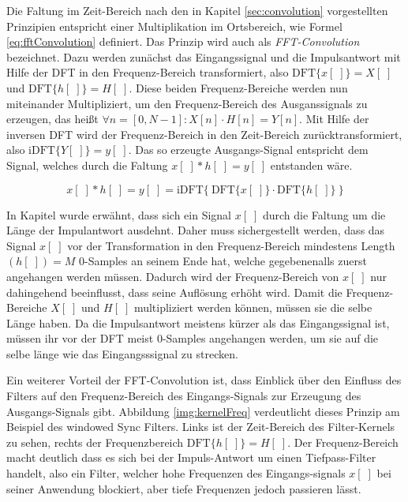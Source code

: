 Die Faltung im Zeit-Bereich nach den in Kapitel \ref{sec:convolution} vorgestellten Prinzipien entspricht einer Multiplikation im Ortsbereich, wie Formel \ref{eq:fftConvolution} definiert. Das Prinzip wird auch als \emph{FFT-Convolution} bezeichnet. Dazu werden zunächst das Eingangssignal und die Impulsantwort mit Hilfe der DFT in den Frequenz-Bereich transformiert, also $\text{DFT}\{x[\;]\} = X[\;]$ und $\text{DFT}\{h[\;]\} = H[\;]$. Diese beiden Frequenz-Bereiche werden nun miteinander Multipliziert, um den Frequenz-Bereich des Ausganssignals zu erzeugen, das heißt $\forall n = [0,N-1]: X[n] \cdot H[n] = Y[n]$. Mit Hilfe der inversen DFT wird der Frequenz-Bereich in den Zeit-Bereich zurücktransformiert, also $\text{iDFT}\{ Y[\;] \} = y[\;]$. Das so erzeugte Ausgangs-Signal entspricht dem Signal, welches durch die Faltung $x[\;] * h[\;] = y[\;]$ entstanden wäre.\cite[S. 182]{dspGuide}

\begin{equation}
x[\;] * h[\;] = y[\;] = \text{iDFT}\Big\{\ \text{DFT}\{x[\;]\} \cdot \text{DFT}\{h[\;]\}\ \Big\}
\label{eq:fftConvolution}
\end{equation}

In Kapitel \label{sec:convolution} wurde erwähnt, dass sich ein Signal $x[\;]$ durch die Faltung um die Länge der Impulantwort ausdehnt. Daher muss sichergestellt werden, dass das Signal $x[\;]$ vor der Transformation in den Frequenz-Bereich mindestens Length$(h[\;]) = M$ 0-Samples an seinem Ende hat, welche gegebenenalls zuerst angehangen werden müssen. Dadurch wird der Frequenz-Bereich von $x[\;]$ nur dahingehend beeinflusst, dass seine Auflösung erhöht wird. Damit die Frequenz-Bereiche $ X[\;]$ und $H[\;]$ multipliziert werden können, müssen sie die selbe Länge haben. Da die Impulsantwort meistens kürzer als das Eingangssignal ist, müssen ihr vor der DFT meist 0-Samples angehangen werden, um sie auf die selbe länge wie das Eingangsssignal \glqq zu strecken\grqq{}.\cite[S. 183 -184]{dspGuide}

Ein weiterer Vorteil der FFT-Convolution ist, dass Einblick über den Einfluss des Filters auf den Frequenz-Bereich des Eingangs-Signals zur Erzeugung des Ausgangs-Signals gibt. Abbildung \ref{img:kernelFreq} verdeutlicht dieses Prinzip am Beispiel des \glqq windowed Sync Filters\grqq.  Links ist der Zeit-Bereich des Filter-Kernels zu sehen, rechts der Frequenzbereich $\text{DFT}\{h[\;]\} = H[\;]$. Der Frequenz-Bereich macht deutlich dass es sich bei der Impuls-Antwort um einen Tiefpass-Filter handelt, also ein Filter, welcher hohe Frequenzen des Eingangs-signals $x[\;]$ bei seiner Anwendung blockiert, aber tiefe Frequenzen jedoch passieren lässt.\cite[S. 180]{dspGuide}

